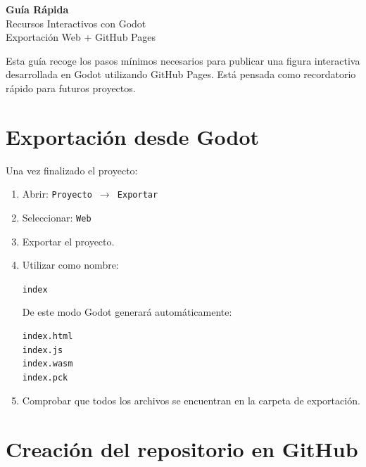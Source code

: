 \documentclass[11pt,a4paper]{article}
\begin{document}
\begin{center}

{\Huge\bfseries Guía Rápida}\\[0.4cm]

{\LARGE Recursos Interactivos con Godot}\\[0.3cm]

{\large Exportación Web + GitHub Pages}

\vspace{0.5cm}

\begin{tcolorbox}[
	colback=lightblue,
	colframe=godotblue,
	width=0.9\textwidth
]
Esta guía recoge los pasos mínimos necesarios para publicar una figura
interactiva desarrollada en Godot utilizando GitHub Pages.
Está pensada como recordatorio rápido para futuros proyectos.
\end{tcolorbox}

\end{center}

\section{Exportación desde Godot}

Una vez finalizado el proyecto:

\begin{enumerate}[label=\arabic*.]
	\item Abrir:
	\texttt{Proyecto $\rightarrow$ Exportar}
	
	\item Seleccionar:
	\texttt{Web}
	
	\item Exportar el proyecto.
	
	\item Utilizar como nombre:
	
	\begin{center}
		\Large\texttt{index}
	\end{center}
	
	De este modo Godot generará automáticamente:
	
\begin{lstlisting}
index.html
index.js
index.wasm
index.pck
\end{lstlisting}

	\item Comprobar que todos los archivos se encuentran en la carpeta de exportación.
\end{enumerate}

\section{Creación del repositorio en GitHub}
\end{document}
